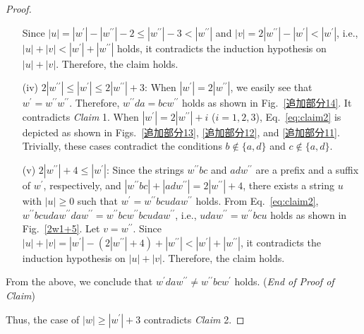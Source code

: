 \begin{proof}
\begin{enumerate}
  Since $|u| = |w^{\prime}| - |w^{\prime\prime}| - 2 \leq |w^{\prime\prime}| - 3 < |w^{\prime\prime}|$ and $|v| = 2|w^{\prime\prime}| - |w^{\prime}| < |w^{\prime}|$, i.e., $|u| + |v| < |w^{\prime}| + |w^{\prime\prime}|$ holds, it contradicts the induction hypothesis on $|u| + |v|$. Therefore, the claim holds.
  \item[(iv)] $2|w^{\prime\prime}| \le |w^{\prime}| \le 2|w^{\prime\prime}|+3$:
  When $|w^{\prime}|=2|w^{\prime\prime}|$, we easily see that $w^{\prime} = w^{\prime\prime}w^{\prime\prime}$.
  Therefore, $w^{\prime\prime}da = bcw^{\prime\prime}$ holds as shown in Fig.~\ref{追加部分14}.
  It contradicts \textit{Claim} 1.
  When $|w^{\prime}|=2|w^{\prime\prime}|+i$ ($i=1,2,3$), Eq.~\ref{eq:claim2} is depicted as shown in Figs.~\ref{追加部分13}, \ref{追加部分12}, and \ref{追加部分11}. Trivially, these cases contradict the conditions $b \not\in \{a,d\}$ and $c \not\in \{a,d\}$.
  \item[(v)] $2|w^{\prime\prime}|+4 \leq |w^{\prime}|$:
  Since the strings $w^{\prime\prime}bc$ and $adw^{\prime\prime}$ are a prefix and a suffix of $w^{\prime}$, respectively, and $|w^{\prime\prime}bc| + |adw^{\prime\prime}| = 2|w^{\prime\prime}| + 4$, there exists a string $u$ with $|u| \geq 0$ such that $w^{\prime} = w^{\prime\prime}bcudaw^{\prime\prime}$ holds. From Eq.~\ref{eq:claim2}, $w^{\prime\prime}bcudaw^{\prime\prime}daw^{\prime\prime} = w^{\prime\prime}bcw^{\prime\prime}bcudaw^{\prime\prime}$, i.e., $udaw^{\prime\prime} = w^{\prime\prime}bcu$ holds as shown in Fig.~\ref{2w1+5}.
  Let $v = w^{\prime\prime}$.
  Since $|u| + |v| = |w^{\prime}|- (2|w^{\prime\prime}| + 4) + |w^{\prime\prime}| < |w^{\prime}| + |w^{\prime\prime}|$, it contradicts the induction hypothesis on $|u| + |v|$. Therefore, the claim holds.
  \end{enumerate}
  From the above, we conclude that $w^{\prime}daw^{\prime\prime} \not = w^{\prime\prime}bcw^{\prime}$ holds.
  (\textit{End of Proof of Claim})

\smallskip

\noindent
Thus, the case of $|w| \geq |w^{\prime}| + 3$ contradicts \textit{Claim} 2. 


\end{proof}
